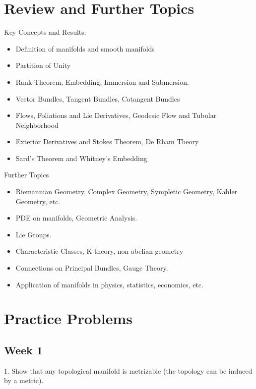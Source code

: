 \documentclass{article}
\theoremstyle{definition}
\begin{document}
\newpage

\section{Review and Further Topics}

Key Concepts and Results:

\begin{itemize}
    \item Definition of manifolds and smooth manifolds
    \item Partition of Unity
    \item Rank Theorem, Embedding, Immersion and Submersion.
    \item Vector Bundles, Tangent Bundles, Cotangent Bundles
    \item Flows, Foliations and Lie Derivatives, Geodesic Flow and Tubular Neighborhood
    \item Exterior Derivatives and Stokes Theorem, De Rham Theory
    \item Sard's Theorem and Whitney's Embedding
\end{itemize}


Further Topics

\begin{itemize}
    \item Riemannian Geometry, Complex Geometry, Sympletic Geometry, Kahler Geometry, etc.
    \item PDE on manifolds, Geometric Analysis.
    \item Lie Groups.
    \item Characteristic Classes, K-theory, non abelian geometry
    \item Connections on Principal Bundles, Gauge Theory.
    \item Application of manifolds in physics, statistics, economics, etc. 
\end{itemize}

\newpage
\appendix

\section{Practice Problems}

\subsection{Week 1}

1. Show that any topological manifold is metrizable (the topology can be induced by a metric).\\
\end{document}
